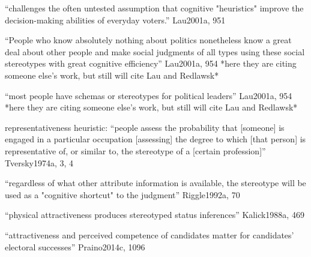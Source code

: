 		``challenges the often untested assumption that cognitive "heuristics" improve the decision-making abilities of everyday voters.'' Lau2001a, 951




	
	

		``People who know absolutely nothing about politics nonetheless know a great deal about other people and make social judgments of all types using these social stereotypes with great cognitive efficiency'' Lau2001a, 954 *here they are citing someone else's work, but still will cite Lau and Redlawsk*

		``most people have schemas or stereotypes for political leaders'' Lau2001a, 954 *here they are citing someone else's work, but still will cite Lau and Redlawsk*

		representativeness heuristic: ``people assess the probability that [someone] is engaged in a particular occupation [assessing] the degree to which [that person] is representative of, or similar to, the stereotype of a [certain profession]'' Tversky1974a, 3, 4

		``regardless of what other attribute information is available, the stereotype will be used as a "cognitive shortcut" to the judgment'' Riggle1992a, 70

		``physical attractiveness produces stereotyped status inferences'' Kalick1988a, 469

		``attractiveness and perceived competence of candidates matter for candidates’ electoral successes'' Praino2014c, 1096






